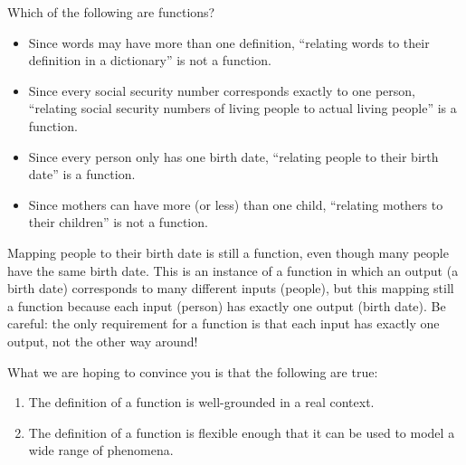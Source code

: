 \documentclass{ximera}
\begin{document}
\begin{question}
  Which of the following are functions?
  \begin{selectAll}
  \end{selectAll}
  \begin{feedback}\hfil
    \begin{itemize}
    \item Since words may have more than one definition, ``relating
      words to their definition in a dictionary'' is not a function.
    \item Since every social security number corresponds exactly to
      one person, ``relating social security numbers of living people
      to actual living people'' is a function.
    \item Since every person only has one birth date, ``relating
      people to their birth date'' is a function.
      \item Since mothers can have more (or less) than one child,
        ``relating mothers to their children'' is not a function.
    \end{itemize}
  \end{feedback}
  
  \begin{warning}

Mapping people to their birth date is still a function, even though many people have the same birth date.  This is an instance of a function in which an output (a birth date) corresponds to many different inputs (people), but this mapping still a function because each input (person) has exactly one output (birth date).  Be careful: the only requirement for a function is that each input has exactly one output, not the other way around!

\end{warning}

\end{question}

What we are hoping to convince you is that the following are true:
\begin{enumerate}
\item The definition of a function is well-grounded in a real context.
\item The definition of a function is flexible enough that it can be
  used to model a wide range of phenomena.
\end{enumerate}
\end{document}
